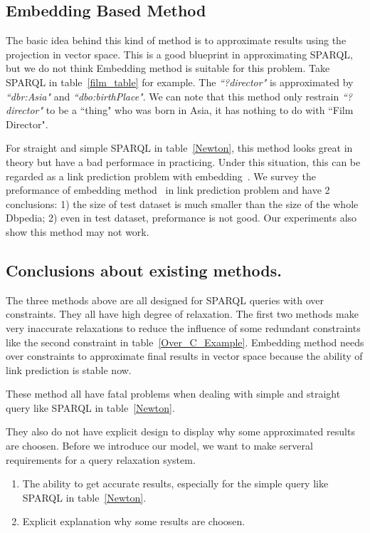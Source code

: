 \documentclass[runningheads]{llncs}
\begin{document}
\subsection{Embedding Based Method}
The basic idea behind this kind of method is to approximate results using the projection in vector space.
This is a good  blueprint in approximating SPARQL, but we do not think Embedding method is suitable for this problem. Take SPARQL in table~\ref{film_table} for example. The \textit{``?director"} is approximated by \textit{``dbr:Asia"} and \textit{``dbo:birthPlace"}. We can note that this method only restrain \textit{``?director"} to be a ``thing" who was born in Asia, it has nothing to do with ``Film Director".

For straight and simple SPARQL in table~\ref{Newton}, this method looks great in theory but have a bad performace in practicing. Under this situation, this can be regarded as a link prediction problem with embedding~\cite{kazemi2018simple}. We survey the preformance of embedding method~\cite{bordes2013translating,ji2015knowledge,qian2018translating} in link prediction problem and have 2 conclusions: 1) the size of test dataset is much smaller than the size of the whole Dbpedia; 2) even in test dataset, preformance is not good. Our experiments also show this method may not work.

\subsection{Conclusions about existing methods.}
The three methods above are all designed for SPARQL queries with over constraints.
They all have high degree of relaxation. The first two methods make very inaccurate relaxations to reduce the influence of some redundant constraints like the second constraint in table~\ref{Over_C_Example}. Embedding method needs over constraints to approximate final results in vector space because the ability of link prediction is stable now.

These method all have fatal problems when dealing with simple and straight query like SPARQL in table~\ref{Newton}.

They also do not have explicit design to display why some approximated results are choosen. Before we introduce our model, we want to make serveral requirements for a query relaxation system.
\begin{enumerate}
  \item The ability to get accurate results, especially for the simple query like SPARQL in table~\ref{Newton}.
  \item Explicit explanation why some results are choosen.
\end{enumerate}
\end{document}
